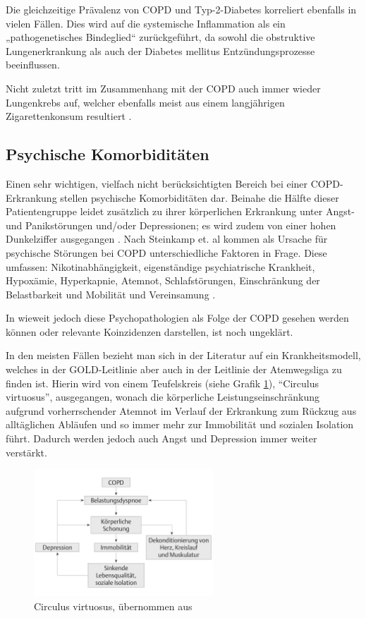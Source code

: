 Die gleichzeitige Prävalenz von COPD und Typ-2-Diabetes korreliert ebenfalls in vielen Fällen. Dies wird auf die systemische Inflammation als ein „pathogenetisches Bindeglied“ zurückgeführt, da sowohl die obstruktive Lungenerkrankung als auch der Diabetes mellitus Entzündungsprozesse beeinflussen.

Nicht zuletzt tritt im Zusammenhang mit der COPD auch immer wieder Lungenkrebs auf, welcher ebenfalls meist aus einem langjährigen Zigarettenkonsum resultiert \autocite[vgl.][38]{stiefelhagen2013}.


\subsection{Psychische Komorbiditäten}
\label{psychische_komorbiditaet}
Einen sehr wichtigen, vielfach nicht berücksichtigten Bereich bei einer COPD-Erkrankung stellen psychische Komorbiditäten dar.
Beinahe die Hälfte dieser Patientengruppe leidet zusätzlich zu ihrer körperlichen Erkrankung unter Angst- und Panikstörungen und/oder Depressionen; es wird zudem von einer hohen Dunkelziffer ausgegangen \autocite[vgl.][157]{fischer2007}.
Nach Steinkamp et. al kommen als Ursache für psychische Störungen bei COPD unterschiedliche Faktoren in Frage.
Diese umfassen: Nikotinabhängigkeit, eigenständige psychiatrische Krankheit, Hypoxämie, Hyperkapnie, Atemnot, Schlafstörungen, Einschränkung der Belastbarkeit und Mobilität und Vereinsamung \autocite[vgl.][157]{fischer2007}.
 
In wieweit jedoch diese Psychopathologien als Folge der COPD gesehen werden können oder relevante Koinzidenzen darstellen, ist noch ungeklärt. 

In den meisten Fällen bezieht man sich in der Literatur auf ein Krankheitsmodell, welches in der GOLD-Leitlinie aber auch in der Leitlinie der Atemwegsliga zu finden ist. Hierin wird von einem Teufelskreis (siehe Grafik  \ref{fig:copd_teufelskreis}), "`Circulus virtuosus"', ausgegangen, wonach die körperliche Leistungseinschränkung aufgrund vorherrschender Atemnot im Verlauf der Erkrankung zum Rückzug aus alltäglichen Abläufen und so immer mehr zur Immobilität und sozialen Isolation führt. 
Dadurch werden jedoch auch Angst und Depression immer weiter verstärkt. 

\begin{figure}
 \centering
  \includegraphics[width=0.6\textwidth]{teufelskreis}
  \caption{Circulus virtuosus, übernommen aus \cite[e19]{vogelmeier2007}}
  \label{fig:copd_teufelskreis}
\end{figure}

